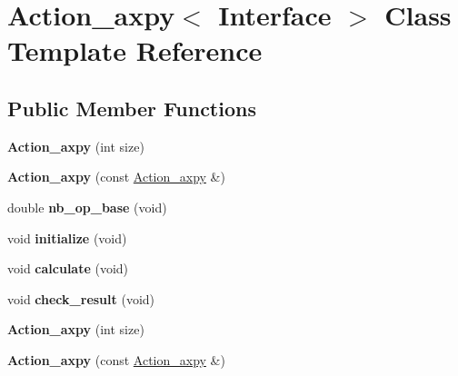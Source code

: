 \hypertarget{class_action__axpy}{}\section{Action\+\_\+axpy$<$ Interface $>$ Class Template Reference}
\label{class_action__axpy}
\subsection*{Public Member Functions}
\begin{DoxyCompactItemize}
\item 
\mbox{\label{class_action__axpy_a4038da514eb12db6ba745cb60dfa1177}} 
{\bfseries Action\+\_\+axpy} (int size)
\item 
\mbox{\label{class_action__axpy_abca08a617ee0918d30e65b0235188b53}} 
{\bfseries Action\+\_\+axpy} (const \hyperlink{class_action__axpy}{Action\+\_\+axpy} \&)
\item 
\mbox{\label{class_action__axpy_a9b7d91c1404faeeddd039e1d1175319e}} 
double {\bfseries nb\+\_\+op\+\_\+base} (void)
\item 
\mbox{\label{class_action__axpy_a7ce00fdc6b6fe827efac91dd64e8ace9}} 
void {\bfseries initialize} (void)
\item 
\mbox{\label{class_action__axpy_abd728290c46deced00f78948e0e9814f}} 
void {\bfseries calculate} (void)
\item 
\mbox{\label{class_action__axpy_aa7e99f2d942661c579dd1c04521e4212}} 
void {\bfseries check\+\_\+result} (void)
\item 
\mbox{\label{class_action__axpy_a4038da514eb12db6ba745cb60dfa1177}} 
{\bfseries Action\+\_\+axpy} (int size)
\item 
\mbox{\label{class_action__axpy_abca08a617ee0918d30e65b0235188b53}} 
{\bfseries Action\+\_\+axpy} (const \hyperlink{class_action__axpy}{Action\+\_\+axpy} \&)
\item 
\mbox{\label{class_action__axpy_a9b7d91c1404faeeddd039e1d1175319e}} 

\end{DoxyCompactItemize}
